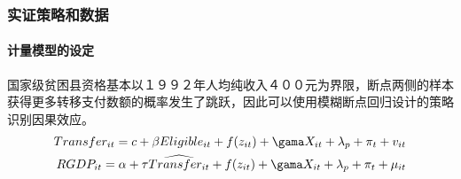 \begin{frame}[t]
	\frametitle{实证策略和数据}
	\framesubtitle{计量模型的设定}
	国家级贫困县资格基本以１９９２年人均纯收入４００元为界限，断点两侧的样本获得更多转移支付数额的概率发生了跳跃，因此可以使用模糊断点回归设计的策略识别因果效应。
	\begin{align}
		Transfer_{it}=c+\beta Eligible_{it}+f(z_{it})+\gama X_{it} +\lambda_p+\pi_t+v_{it}\\
		RGDP_{it} = \alpha +\tau \widehat{Transfer_{it}}+f(z_{it})+\gama X_{it} +\lambda_p+\pi _t+\mu_{it}
	\end{align}
\end{frame}

